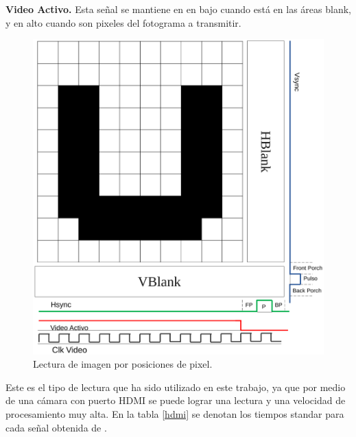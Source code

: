 \documentclass[twoside,spanish,ESP,MSc]{plantillaLabUPV}
\theoremstyle{definition}
\begin{document}
\begin{enumerate}
 \checkmark\textbf{Video Activo.} Esta señal se mantiene en en bajo cuando está en las áreas blank, y en alto cuando son pixeles del fotograma a transmitir.
 
 
 \begin{figure}[h]
 	\centering
 	\includegraphics[scale=0.3]{edrawimas/scanU}
 	\caption{Lectura de imagen por posiciones de pixel. 
 		\label{scanU}}
 \end{figure}
 
\end{enumerate}

Este es el tipo de lectura que ha sido utilizado en este trabajo, ya que por medio de una cámara con puerto HDMI se puede lograr una lectura y una velocidad de procesamiento muy alta. En la tabla \ref{hdmi} se denotan los tiempos standar para cada señal obtenida de \cite{demisti}.
\end{document}
